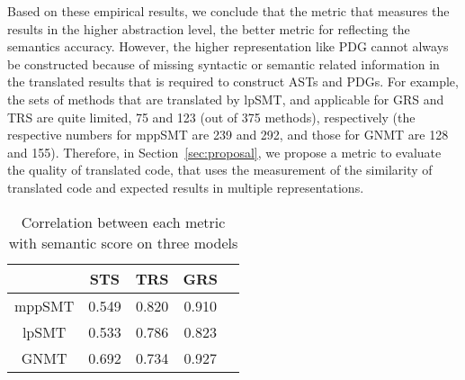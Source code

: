Based on these empirical results, we conclude that the metric that
measures the results in the higher abstraction level, the better
metric for reflecting the semantics accuracy. However, the higher
representation like PDG cannot always be constructed because of
missing syntactic or semantic related information in the translated
results that is required to construct ASTs and PDGs. For example, the
sets of methods that are translated by lpSMT, and applicable for GRS
and TRS are quite limited, 75 and 123 (out of 375 methods),
respectively (the respective numbers for mppSMT are 239 and 292, and
those for GNMT are 128 and 155). Therefore, in
Section~\ref{sec:proposal}, we propose a metric to evaluate the
quality of translated code, that uses the measurement of the
similarity of translated code and expected results in multiple
representations.



\begin{table}
\centering
\caption{Correlation between each metric with  semantic score on three models}
\begin{tabular}{|c|c|c|c|c|}
\hline
 & STS & TRS & GRS\\
\hline
mppSMT  & 0.549 & 0.820 & 0.910 \\
\hline
lpSMT  & 0.533 & 0.786 & 0.823 \\
\hline
GNMT & 0.692 & 0.734 & 0.927 \\
\hline
\end{tabular}
\label{table:correlation}
\end{table}


%


